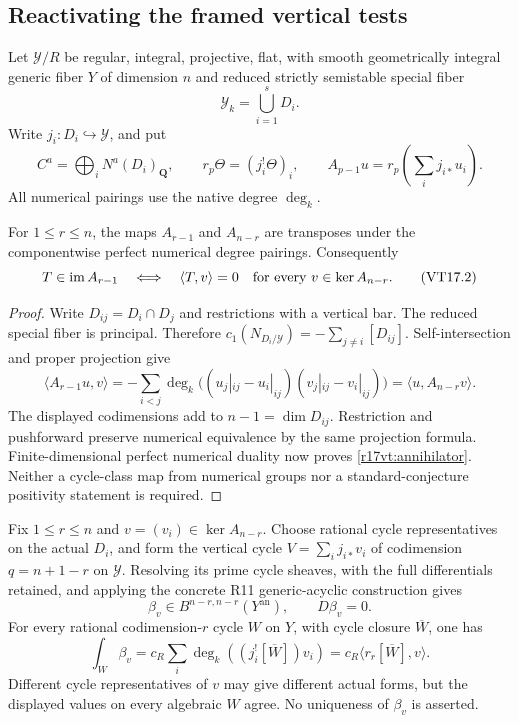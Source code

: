 \subsection{Reactivating the framed vertical tests}

Let $\mathcal Y/R$ be regular, integral, projective, flat,
with smooth geometrically integral generic fiber $Y$ of dimension $n$ and
reduced strictly semistable special fiber
\[
              \mathcal Y_k=\bigcup_{i=1}^sD_i.
\]
Write $j_i:D_i\hookrightarrow\mathcal Y$, and put
\[
 C^a=\bigoplus_iN^a(D_i)_{\mathbf Q},\qquad
 r_p\Theta=(j_i^!\Theta)_i,\qquad
 A_{p-1}u=r_p\left(\sum_i j_{i*}u_i\right).
 \tag{VT17.1}\label{r17vt:numerical-system}
\]
All numerical pairings use the native degree $\deg_k$.

\begin{lemma}
\label{r17vt:transpose}
For $1\le r\le n$, the maps $A_{r-1}$ and $A_{n-r}$
are transposes under the componentwise perfect numerical
degree pairings. Consequently
\[
 T\in\operatorname{im}A_{r-1}
 \quad\Longleftrightarrow\quad
 \langle T,v\rangle=0\quad\hbox{for every }v\in\ker A_{n-r}.
 \tag{VT17.2}\label{r17vt:annihilator}
\]
\end{lemma}

\begin{proof}
Write $D_{ij}=D_i\cap D_j$ and restrictions with a vertical
bar. The reduced special fiber is principal. Therefore
$c_1(N_{D_i/\mathcal Y})=-\sum_{j\ne i}[D_{ij}]$.
Self-intersection and proper projection give
\[
 \langle A_{r-1}u,v\rangle
   =-\sum_{i<j}\deg_k
       \bigl((u_j|_{ij}-u_i|_{ij})(v_j|_{ij}-v_i|_{ij})\bigr)
   =\langle u,A_{n-r}v\rangle.
\]
The displayed codimensions add to $n-1=\dim D_{ij}$.
Restriction and pushforward preserve numerical equivalence
by the same projection formula. Finite-dimensional perfect
numerical duality now proves \eqref{r17vt:annihilator}.
Neither a cycle-class map from numerical groups nor a
standard-conjecture positivity statement is required.
\end{proof}

\begin{lemma}
\label{r17vt:vertical}
Fix $1\le r\le n$ and $v=(v_i)\in\ker A_{n-r}$.
Choose rational cycle representatives on the actual $D_i$,
and form the vertical cycle
$V=\sum_i j_{i*}v_i$ of codimension $q=n+1-r$ on
$\mathcal Y$. Resolving its prime cycle sheaves, with the
full differentials retained, and applying the concrete
R11 generic-acyclic construction gives
\[
       \beta_v\in B^{n-r,n-r}(Y^{\mathrm{an}}),
       \qquad D\beta_v=0.
       \tag{VT17.3}\label{r17vt:vertical-output}
\]
For every rational codimension-$r$ cycle $W$ on $Y$, with
cycle closure $\overline W$, one has
\[
 \int_W\beta_v
       =c_R\sum_i\deg_k((j_i^![\overline W])v_i)
       =c_R\langle r_r[\overline W],v\rangle.
 \tag{VT17.4}\label{r17vt:vertical-pairing}
\]
Different cycle representatives of $v$ may give different
actual forms, but the displayed values on every algebraic
$W$ agree. No uniqueness of $\beta_v$ is asserted.
\end{lemma}


